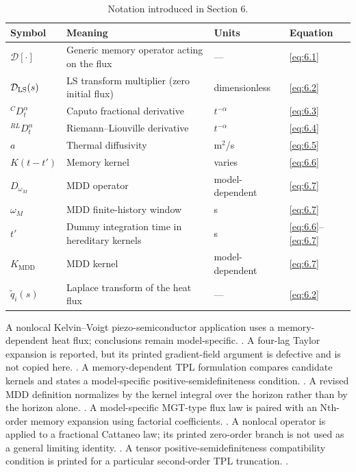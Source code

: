 \begin{table}[htbp]
\centering
\small
\caption{Notation introduced in Section 6.}
\label{tab:notation-sec6}
\begin{tabularx}{\textwidth}{@{}p{1.8cm}X p{2.2cm}p{2.1cm}@{}}
\toprule
\textbf{Symbol} & \textbf{Meaning} & \textbf{Units} & \textbf{Equation} \\
\midrule
$\mathcal{D}[\cdot]$ & Generic memory operator acting on the flux & --- & \eqref{eq:6.1} \\
$\mathcal{D}_{\rm LS}(s)$ & LS transform multiplier (zero initial flux) & dimensionless & \eqref{eq:6.2} \\
${}^C D_t^\alpha$ & Caputo fractional derivative & $t^{-\alpha}$ & \eqref{eq:6.3} \\
${}^{RL} D_t^\alpha$ & Riemann--Liouville derivative & $t^{-\alpha}$ & \eqref{eq:6.4} \\
$a$ & Thermal diffusivity & m$^2$/s & \eqref{eq:6.5} \\
$K(t-t')$ & Memory kernel & varies & \eqref{eq:6.6} \\
$D_{\omega_M}$ & MDD operator & model-dependent & \eqref{eq:6.7} \\
$\omega_M$ & MDD finite-history window & s & \eqref{eq:6.7} \\
$t'$ & Dummy integration time in hereditary kernels & s & \eqref{eq:6.6}--\eqref{eq:6.7} \\
$K_{\mathrm{MDD}}$ & MDD kernel & model-dependent & \eqref{eq:6.7} \\
$\tilde{q}_i(s)$ & Laplace transform of the heat flux & --- & \eqref{eq:6.2} \\
\bottomrule
\end{tabularx}
\end{table}

A nonlocal Kelvin–Voigt piezo-semiconductor application uses a memory-dependent heat flux; conclusions remain model-specific. \cite{Gupta2026HeatMap}. A four-lag Taylor expansion is reported, but its printed gradient-field argument is defective and is not copied here. \cite{Abouelregal2020a}. A memory-dependent TPL formulation compares candidate kernels and states a model-specific positive-semidefiniteness condition. \cite{Sur2019}. A revised MDD definition normalizes by the kernel integral over the horizon rather than by the horizon alone. \cite{Wang2021}. A model-specific MGT-type flux law is paired with an Nth-order memory expansion using factorial coefficients. \cite{Sur2025}. A nonlocal operator is applied to a fractional Cattaneo law; its printed zero-order branch is not used as a general limiting identity. \cite{Bachher2019}. A tensor positive-semidefiniteness compatibility condition is printed for a particular second-order TPL truncation. \cite{Tiwari2021}.


